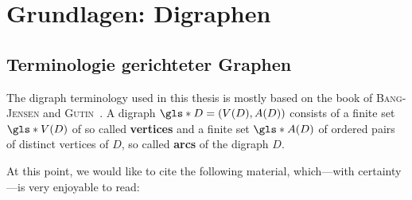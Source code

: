 \chapter{Grundlagen: Digraphen}

\section{Terminologie gerichteter Graphen}
The digraph terminology used in this thesis is mostly based on the book of \textsc{Bang-Jensen} and \textsc{Gutin}~\cite{bang2008digraphs}. A digraph $\gls*{D}=(V(D),A(D))$ consists of a finite set $\gls*{V(D)}$ of so called \textbf{vertices} and a finite set $\gls*{A(D)}$ of ordered pairs of distinct vertices of $D$, so called \textbf{arcs} of the digraph $D$. 

At this point, we would like to cite the following material, which---with certainty---is very enjoyable to read: \cite{Bang-Jensen2020Critical, borodin1977criterion, borodin1977criterion, dirac1950colouring, schweser2018low-connectivity, schweser2020crit, stiebitz2015brooks}